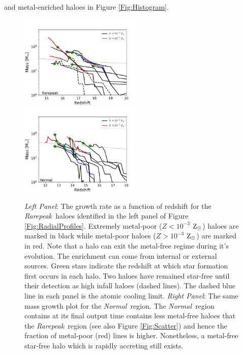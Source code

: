 \documentclass[graphics, twocolumn, usenatbib]{mn2e}
\newcommand{\zsolarc} {$\rm{Z_{\odot}}$}
\newcommand{\rarepeak} {\textit{Rarepeak~}}
\newcommand{\normal} {\textit{Normal~}}
\begin{document}
and metal-enriched haloes in Figure \ref{Fig:Histogram}.
\begin{figure} 
\centering
\begin{minipage}{175mm}      \begin{center} 
\centerline{
\includegraphics[width=0.525\textwidth]{FIGURES/Rarepeak_MassRedshift.png}
\includegraphics[width=0.525\textwidth]{FIGURES/Normal_MassRedshift.png}}
\caption{\textit{Left Panel}: The growth rate as a function of redshift for the \rarepeak haloes
  identified in the left
  panel of Figure \ref{Fig:RadialProfiles}. Extremely metal-poor ($Z < 10^{-3}$ \zsolarc) haloes are
  marked in black while metal-poor haloes ($Z > 10^{-3}$ \zsolarc) are marked in red. Note that a
  halo can exit the metal-free regime during it's evolution. The enrichment can come from internal
  or external sources. Green stars indicate the redshift at which star formation first occurs in
  each halo. Two haloes have remained star-free until their detection as high infall haloes
  (dashed lines). The dashed blue line in each panel is the atomic cooling limit.
  \textit{Right Panel}: The same mass growth plot for the \normal region. The \normal region
  contains at its final output time contains less metal-free haloes that the \rarepeak region
  (see also Figure \ref{Fig:Scatter}) and hence the fraction of metal-poor (red) lines is higher.
  Nonetheless, a metal-free star-free halo which is rapidly accreting still exists. 
}\label{Fig:GrowthRates}
\end{center} \end{minipage}

\end{figure}
\end{document}
